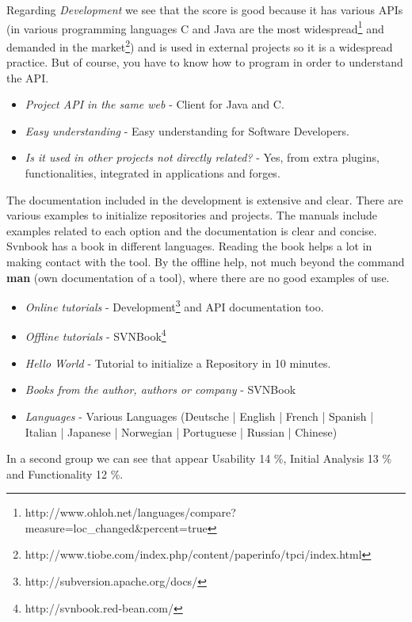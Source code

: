 \documentclass[11pt]{scrartcl}
\begin{document}
\par Regarding \emph{Development} we see that the score is good because it has various APIs (in various programming languages ​​C and Java are the most widespread\footnote{http://www.ohloh.net/languages/compare?measure=loc\_changed\&percent=true} and demanded in the market\footnote{http://www.tiobe.com/index.php/content/paperinfo/tpci/index.html}) and is used in external projects so it is a widespread practice. But of course, you have to know how to program in order to understand the API.

\begin{itemize}
    \item \emph{Project API in the same web} - Client for Java and C.
    \item \emph{Easy understanding} - Easy understanding for Software Developers. 
    \item \emph{Is it used in other projects not directly related?} - Yes, from extra plugins, functionalities, integrated in applications and forges.
\end{itemize}
  
\par The documentation included in the development is extensive and clear. There are various examples to initialize repositories and projects. The manuals include examples related to each option and the documentation is clear and concise. Svnbook has a book in different languages. Reading the book helps a lot in making contact with the tool. By the offline help, not much beyond the command \textbf{man} (own documentation of a tool), where there are no good examples of use.

\begin{itemize}
    \item \emph{Online tutorials} - Development\footnote{http://subversion.apache.org/docs/} and API documentation too.
    \item \emph{Offline tutorials} - SVNBook\footnote{http://svnbook.red-bean.com/}
    \item \emph{Hello World} - Tutorial to initialize a Repository in 10 minutes.
    \item \emph{Books from the author, authors or company} -  SVNBook
    \item \emph{Languages} - Various Languages (Deutsche | English | French | Spanish | Italian | Japanese | Norwegian | Portuguese | Russian | Chinese)
\end{itemize}

\par In a second group we can see that appear Usability 14 \%, Initial Analysis 13 \% and Functionality 12 \%.
\end{document}
